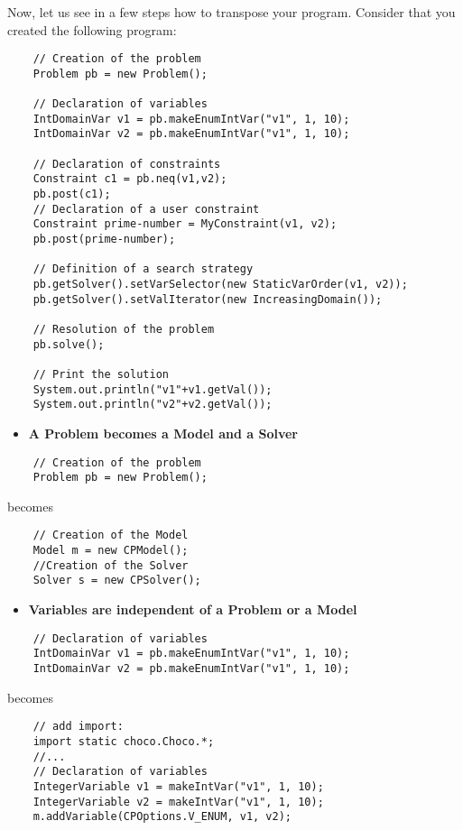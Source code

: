 Now, let us see in a few steps how to transpose your program. Consider that you created the following program:
\begin{lstlisting}
	// Creation of the problem
	Problem pb = new Problem();
	
	// Declaration of variables
	IntDomainVar v1 = pb.makeEnumIntVar("v1", 1, 10);
	IntDomainVar v2 = pb.makeEnumIntVar("v1", 1, 10);
	
	// Declaration of constraints
	Constraint c1 = pb.neq(v1,v2);
	pb.post(c1);
	// Declaration of a user constraint
	Constraint prime-number = MyConstraint(v1, v2);
	pb.post(prime-number);
	
	// Definition of a search strategy
	pb.getSolver().setVarSelector(new StaticVarOrder(v1, v2));
	pb.getSolver().setValIterator(new IncreasingDomain());
	
	// Resolution of the problem
	pb.solve();
	
	// Print the solution
	System.out.println("v1"+v1.getVal());
	System.out.println("v2"+v2.getVal());
\end{lstlisting}

\begin{itemize}
	\item \textbf{A Problem becomes a Model and a Solver}
\end{itemize}

\begin{lstlisting}
	// Creation of the problem
	Problem pb = new Problem();
\end{lstlisting}
becomes
\begin{lstlisting}
	// Creation of the Model
	Model m = new CPModel();
	//Creation of the Solver
	Solver s = new CPSolver();
\end{lstlisting}

\begin{itemize}
	\item \textbf{Variables are independent of a Problem or a Model}
\end{itemize}

\begin{lstlisting}
	// Declaration of variables
	IntDomainVar v1 = pb.makeEnumIntVar("v1", 1, 10);
	IntDomainVar v2 = pb.makeEnumIntVar("v1", 1, 10);
\end{lstlisting}
becomes
\begin{lstlisting}
	// add import:
	import static choco.Choco.*;
	//...
	// Declaration of variables
	IntegerVariable v1 = makeIntVar("v1", 1, 10);
	IntegerVariable v2 = makeIntVar("v1", 1, 10);
	m.addVariable(CPOptions.V_ENUM, v1, v2);
\end{lstlisting}

